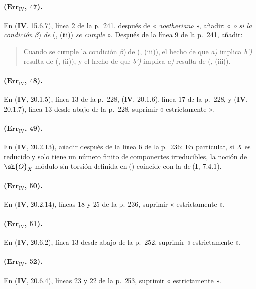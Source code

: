 \paragraph{($\mathbf{Err}_{\mathrm{IV}}$, 47).}
En (\textbf{IV}, 15.6.7), línea 2 de la p.~241, después de « \emph{noetheriano} », añadir:
« \emph{o si la condición} $\beta$) \emph{de}
({}, (iii)) \emph{se cumple} ».
Después de la línea 9 de la p.~241, añadir:
\begin{quote}
Cuando se cumple la condición $\beta$) de
({}, (iii)), el hecho de que
\emph{a)} implica \emph{b')} resulta de
({}, (ii)), y el hecho de que
\emph{b')} implica \emph{a)} resulta de
({}, (iii)).
\end{quote}

\paragraph{($\mathbf{Err}_{\mathrm{IV}}$, 48).}
En (\textbf{IV}, 20.1.5), línea 13 de la p.~228, (\textbf{IV}, 20.1.6), línea 17 de la
p.~228, y (\textbf{IV}, 20.1.7), línea 13 desde abajo de la p.~228, suprimir
« estrictamente ».

\paragraph{($\mathbf{Err}_{\mathrm{IV}}$, 49).}
En (\textbf{IV}, 20.2.13), añadir después de la línea 6 de la p.~236: En
particular, si $X$ es reducido y solo tiene un número finito de
componentes irreducibles, la noción de $\sh{O}_X$-módulo sin torsión
definida en ({})
coincide con la de (\textbf I, 7.4.1).

\paragraph{($\mathbf{Err}_{\mathrm{IV}}$, 50).}
En (\textbf{IV}, 20.2.14), líneas 18 y 25 de la p.~236, suprimir
« estrictamente ».

\paragraph{($\mathbf{Err}_{\mathrm{IV}}$, 51).}
En (\textbf{IV}, 20.6.2), línea 13 desde abajo de la p.~252, suprimir
« estrictamente ».

\paragraph{($\mathbf{Err}_{\mathrm{IV}}$, 52).}
En (\textbf{IV}, 20.6.4), líneas 23 y 22 de la p.~253, suprimir
« estrictamente ».

